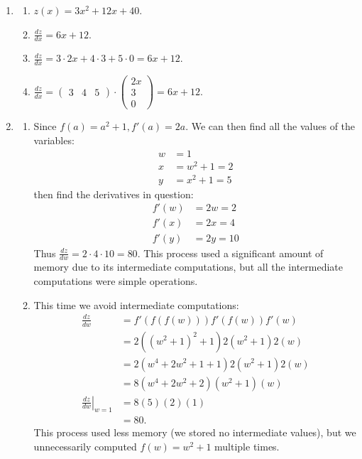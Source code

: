 \documentclass{article}
\begin{document}
\begin{enumerate}
\item \label{DFN_ex_chainrule_solution} 
\begin{enumerate}
    \item $z(x) = 3x^2 + 12x + 40$.
    \item $\frac{dz}{dx} = 6x + 12$.
    \item $\frac{dz}{dx} = 3\cdot2x + 4\cdot 3 + 5\cdot 0 = 6x + 12$.
    \item $\frac{dz}{dx} = \begin{pmatrix} 3 & 4 & 5 \end{pmatrix} \cdot \begin{pmatrix} 2x \\ 3 \\ 0 \end{pmatrix} = 6x + 12$.
\end{enumerate}

\item \label{DFN_ex_chainbackprop_solution} 
\begin{enumerate}
    \item Since $f(a) = a^2 + 1, f'(a) = 2a$. We can then find all the values of the variables:
    \begin{align*}
        w & = 1 \\
        x & = w^2 + 1 = 2 \\
        y & = x^2 + 1 = 5
    \end{align*}
    then find the derivatives in question:
    \begin{align*}
        f'(w) & = 2w = 2 \\
        f'(x) & = 2x = 4 \\
        f'(y) & = 2y = 10
    \end{align*}
    Thus $\frac{dz}{dw} = 2\cdot4\cdot10 = 80$. This process used a significant amount of memory due to its intermediate computations, but all the intermediate computations were simple operations.
    \item This time we avoid intermediate computations:\begin{align*}
    \frac{dz}{dw} & = f'(f(f(w)))                f'(f(w))            f'(w) \\
                  & = 2\left((w^2+1)^2+1 \right) 2\left(w^2+1\right) 2(w) \\
                  & = 2\left(w^4+2w^2+1+1\right) 2\left(w^2+1\right) 2(w) \\
                  & = 8\left(w^4+2w^2+2  \right)  \left(w^2+1\right)  (w) \\
    \left.\frac{dz}{dw}\right\vert_{w=1} 
                  & = 8\left(5\right)\left(2\right)(1) \\
                  & = 80.
    \end{align*}
    This process used less memory (we stored no intermediate values), but we unnecessarily computed $f(w) = w^2+1$ multiple times.
    

\end{enumerate}
\end{enumerate}
\end{document}
